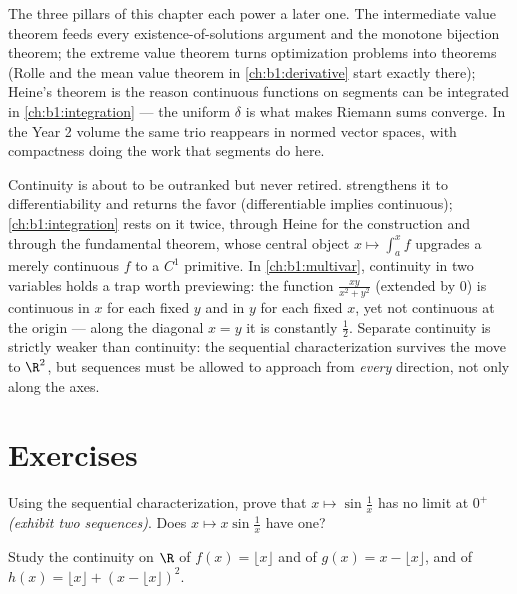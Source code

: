 \begin{remark}
The three pillars of this chapter each power a later one. The
intermediate value theorem feeds every existence-of-solutions
argument and the monotone bijection theorem; the extreme value
theorem turns optimization problems into theorems (Rolle and the
mean value theorem in \cref{ch:b1:derivative} start exactly
there); Heine's theorem is the reason continuous functions on
segments can be integrated in \cref{ch:b1:integration} --- the
uniform $\delta$ is what makes Riemann sums converge. In the Year
2 volume the same trio reappears in normed vector spaces, with
compactness doing the work that segments do here.
\end{remark}

\begin{remark}
Continuity is about to be outranked but never retired.
 strengthens it to differentiability and
returns the favor (differentiable implies continuous);
\cref{ch:b1:integration} rests on it twice, through Heine for
the construction and through the fundamental theorem, whose
central object $x \mapsto \int_a^x f$ upgrades a merely
continuous $f$ to a $C^1$ primitive. In
\cref{ch:b1:multivar}, continuity in two variables holds a trap
worth previewing: the function $\frac{xy}{x^2 + y^2}$ (extended
by $0$) is continuous in $x$ for each fixed $y$ and in $y$ for
each fixed $x$, yet not continuous at the origin --- along the
diagonal $x = y$ it is constantly $\frac12$. Separate continuity
is strictly weaker than continuity: the sequential
characterization survives the move to $\R^2$, but sequences must
be allowed to approach from \emph{every} direction, not only
along the axes.
\end{remark}

\section{Exercises}

\begin{exercise}[$\star$]\label{exo:b1:continuity:1}
Using the sequential characterization, prove that $x \mapsto
\sin\frac 1x$ has no limit at $0^+$ \emph{(exhibit two sequences)}.
Does $x \mapsto x \sin\frac 1x$ have one?
\end{exercise}

\begin{exercise}[$\star$]\label{exo:b1:continuity:2}
Study the continuity on $\R$ of $f(x) = \lfloor x \rfloor$ and of
$g(x) = x - \lfloor x \rfloor$, and of $h(x) = \lfloor x \rfloor +
(x - \lfloor x\rfloor)^2$.
\end{exercise}

